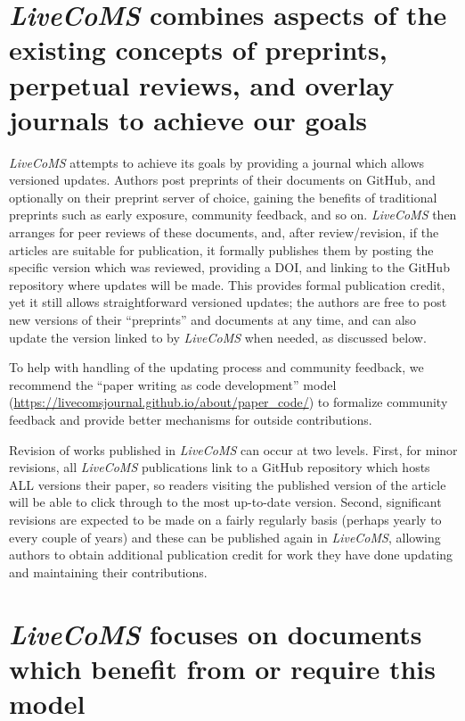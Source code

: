 \documentclass[9pt,editorial]{livecoms}
\begin{document}
\section{\emph{LiveCoMS} combines aspects of the existing concepts of preprints, perpetual reviews, and overlay journals to achieve our goals}

\emph{LiveCoMS} attempts to achieve its goals by providing a journal which allows versioned updates.
Authors post preprints of their documents on GitHub, and optionally on their preprint server of choice, gaining the benefits of traditional preprints such as early exposure, community feedback, and so on. 
\emph{LiveCoMS} then arranges for peer reviews of these documents, and, after review/revision, if the articles are suitable for publication, it formally publishes them by posting the specific version which was reviewed, providing a DOI, and linking to the GitHub repository where updates will be made.
This provides formal publication credit, yet it still allows straightforward versioned updates; the authors are free to post new versions of their ``preprints'' and documents at any time, and can also update the version linked to by \emph{LiveCoMS} when needed, as discussed below.

To help with handling of the updating process and community feedback, we recommend the ``paper writing as code development'' model (\url{https://livecomsjournal.github.io/about/paper_code/}) to formalize community feedback and provide better mechanisms for outside contributions. 

Revision of works published in \emph{LiveCoMS} can occur at two levels. 
First, for minor revisions, all \emph{LiveCoMS} publications link to a GitHub repository which hosts ALL versions their paper, so readers visiting the published version of the article will be able to click through to the most up-to-date version.
Second, significant revisions are expected to be made on a fairly regularly basis (perhaps yearly to every couple of years) and these can be published again in \emph{LiveCoMS}, allowing authors to obtain additional publication credit for work they have done updating and maintaining their contributions. 

\section{\emph{LiveCoMS} focuses on documents which benefit from or require this model}
\end{document}
